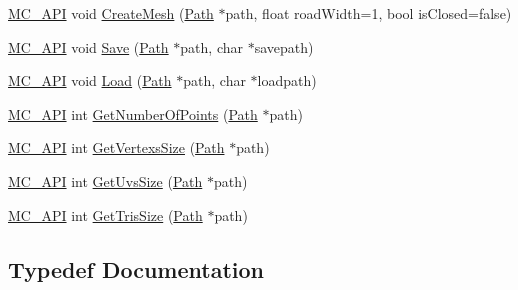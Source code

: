 \begin{DoxyCompactItemize}
\item 
\mbox{\hyperlink{_mesh___creator___controller_8hpp_a529916b90fdb2765a7b955fded854b0a}{M\+C\+\_\+\+A\+PI}} void \mbox{\hyperlink{namespace_m_c_a0eddfa2ea15d9be8c618a192098380ef}{Create\+Mesh}} (\mbox{\hyperlink{class_m_c_1_1_path}{Path}} $\ast$path, float road\+Width=1, bool is\+Closed=false)
\item 
\mbox{\hyperlink{_mesh___creator___controller_8hpp_a529916b90fdb2765a7b955fded854b0a}{M\+C\+\_\+\+A\+PI}} void \mbox{\hyperlink{namespace_m_c_a8107d411ea943330c775a454b26f701b}{Save}} (\mbox{\hyperlink{class_m_c_1_1_path}{Path}} $\ast$path, char $\ast$savepath)
\item 
\mbox{\hyperlink{_mesh___creator___controller_8hpp_a529916b90fdb2765a7b955fded854b0a}{M\+C\+\_\+\+A\+PI}} void \mbox{\hyperlink{namespace_m_c_a70d345d29c8bf1ec85c58472505f1476}{Load}} (\mbox{\hyperlink{class_m_c_1_1_path}{Path}} $\ast$path, char $\ast$loadpath)
\item 
\mbox{\hyperlink{_mesh___creator___controller_8hpp_a529916b90fdb2765a7b955fded854b0a}{M\+C\+\_\+\+A\+PI}} int \mbox{\hyperlink{namespace_m_c_a0d49c1635fffe3e7b53a9c07657f1159}{Get\+Number\+Of\+Points}} (\mbox{\hyperlink{class_m_c_1_1_path}{Path}} $\ast$path)
\item 
\mbox{\hyperlink{_mesh___creator___controller_8hpp_a529916b90fdb2765a7b955fded854b0a}{M\+C\+\_\+\+A\+PI}} int \mbox{\hyperlink{namespace_m_c_acb5b27fd73e4b58e3259f83cedf8cd6e}{Get\+Vertexs\+Size}} (\mbox{\hyperlink{class_m_c_1_1_path}{Path}} $\ast$path)
\item 
\mbox{\hyperlink{_mesh___creator___controller_8hpp_a529916b90fdb2765a7b955fded854b0a}{M\+C\+\_\+\+A\+PI}} int \mbox{\hyperlink{namespace_m_c_aee2106bde63b01f674a0e7546e3f91cf}{Get\+Uvs\+Size}} (\mbox{\hyperlink{class_m_c_1_1_path}{Path}} $\ast$path)
\item 
\mbox{\hyperlink{_mesh___creator___controller_8hpp_a529916b90fdb2765a7b955fded854b0a}{M\+C\+\_\+\+A\+PI}} int \mbox{\hyperlink{namespace_m_c_a31d92d2139692e2eff5847ef34832826}{Get\+Tris\+Size}} (\mbox{\hyperlink{class_m_c_1_1_path}{Path}} $\ast$path)
\end{DoxyCompactItemize}


\subsection{Typedef Documentation}
\mbox{\label{namespace_m_c_ae49fc0a0f3e78b01be72793719d33214}} 
